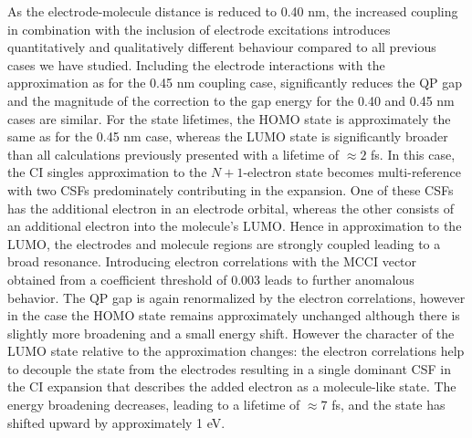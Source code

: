 As the electrode-molecule distance is reduced to 0.40 nm, the increased
coupling in combination with the inclusion of electrode excitations
introduces quantitatively and qualitatively different behaviour compared
to all previous cases we have studied. Including the electrode interactions
with the \dscf approximation as for the 0.45 nm coupling case,
significantly reduces the \ac{QP} gap and the magnitude of the
correction to the gap energy for the 0.40 and 0.45 nm cases are similar.
For the state lifetimes, the HOMO state is approximately the same as for
the 0.45 nm case, whereas the LUMO state is significantly broader than
all calculations previously presented with a lifetime of $\approx 2$ fs.
In this case, the CI singles approximation to the $N+1$-electron state
becomes multi-reference with two CSFs predominately contributing in the
expansion. One of these CSFs has the additional electron in an electrode
orbital, whereas the other consists of an additional electron into the
molecule's LUMO. Hence in \dscf approximation to the LUMO, the electrodes
and molecule regions are strongly coupled leading to a broad resonance.
Introducing electron correlations with the MCCI vector obtained from a
coefficient threshold of 0.003 leads to further anomalous behavior. The
QP gap is again renormalized by the electron correlations, however in the
case the HOMO state remains approximately unchanged although there is
slightly more broadening and a small energy shift. However the character
of the LUMO state relative to the \dscf approximation changes: the
electron correlations help to decouple the state from the electrodes
resulting in a single dominant CSF in the CI expansion that describes the
added electron as a molecule-like state. The energy broadening decreases,
leading to a lifetime of $\approx 7$ fs, and the state has shifted upward
by approximately 1 eV.
 
